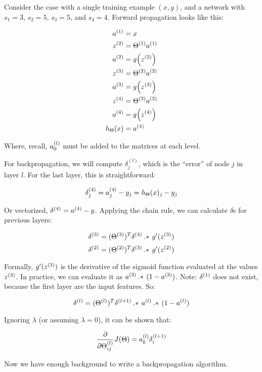 Consider the case with a single training example $(x,y)$,
and a network with $s_1=3$, $s_2=5$, $s_3=5$, and $s_4=4$.
Forward propagation looks like this:

\begin{align*}
    a\s{1} &= x \\
    z\s{2} &= \Theta\s{1}a\s{1} \\
    a\s{2} &= g\qty(z\s{2}) \\
    z\s{3} &= \Theta\s{2}a\s{2} \\
    a\s{3} &= g\qty(z\s{3}) \\
    z\s{4} &= \Theta\s{3}a\s{3} \\
    a\s{4} &= g\qty(z\s{4}) \\
    \hTh(x) &= a\s{4}
\end{align*}

Where, recall, $a\ss{0}{l}$ must be added to the matrices at each level.

For backpropagation, we will compute $\delta_j^{(l)}$, which is the ``error'' of node $j$ in layer $l$.
For the last layer, this is straightforward:

\[ \delta\ss{j}{4}
    = a\ss{j}{4} - y_j 
    = \hTh(x)_j - y_j
\]

Or vectorized, $\delta^{(4)} = a\s{4} - y$.
Applying the chain rule, we can calculate $\delta$s for previous layers:

\[ \delta\s{3} = (\Theta\s{3})^T\delta\s{4} \ewise g'(z\s{3}) \]
\[ \delta\s{2} = (\Theta\s{2})^T\delta\s{3} \ewise g'(z\s{2}) \]

Formally, $g'(z\s{3})$ is the derivative of the sigmoid function evaluated at the values $z\s{3}$.
In practice, we can evaluate it as $a\s{3} \ewise (1-a\s{3})$.
Note: $\delta\s{1}$ does not exist, because the first layer are the input features.
So:

\[ \delta\s{l} = (\Theta\s{l})^T\delta\s{l+1} \ewise a\s{l} \ewise (1 - a\s{l}) \]


Ignoring $\lambda$ (or assuming $\lambda=0$), it can be shown that:

\[ \pdv{\Theta\ss{ij}{l}} J(\Theta) = a\ss{k}{l} \delta\ss{i}{l+1} \]

Now we have enough background to write a backpropagation algorithm.

